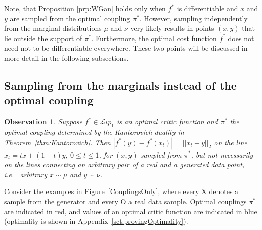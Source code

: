 \documentclass{article} %
\newcommand{\norm}[1]{||{#1}||_2}
\newcommand{\Li}[1]{\mathcal{L}ip_{#1}}
\newcommand{\hp}[1]{\textcolor{red}{#1}}
\newtheorem{observation}{Observation}
\begin{document}
Note, that Proposition \ref{prp:WGan} holds only when $f^*$ is differentiable and $x$ and $y$ are sampled from the optimal coupling $\pi^*$. However, sampling independently from the marginal distributions $\mu$ and $\nu$ very likely results in points $(x,y)$ that lie outside the support of $\pi^*$. Furthermore, the optimal cost function $f^*$ does not need not to be differentiable everywhere. These two points will be discussed in more detail in the following subsections.

\subsection{Sampling from the marginals instead of the optimal coupling}\label{sct:samplingMarginals}

\begin{observation}
Suppose $f^*\in\Li{1}$ is an optimal critic function and $\pi^*$ the optimal coupling determined by the Kantorovich duality in Theorem~\ref{thm:Kantorovich}. Then $|f^*(y)-f^*(x_t)|=\norm{x_t-y}$ on the line  $x_t=tx+(1-t)y,\ 0\leq t \leq 1$, 
for $(x, y)$ sampled from $\pi^*$, but not necessarily on the lines connecting an arbitrary pair of a real and a generated data point,
i.e.~ arbitrary $x \sim \mu$ and $y \sim \nu$.
\end{observation}


Consider the examples in Figure~\ref{CouplingsOnly}, where every 
X denotes a sample from the generator and every O a real data sample. Optimal couplings $\pi^*$ are indicated in red, and values of an optimal critic function are indicated in blue (optimality is shown in Appendix~\ref{sct:provingOptimality}). 


\end{document}

